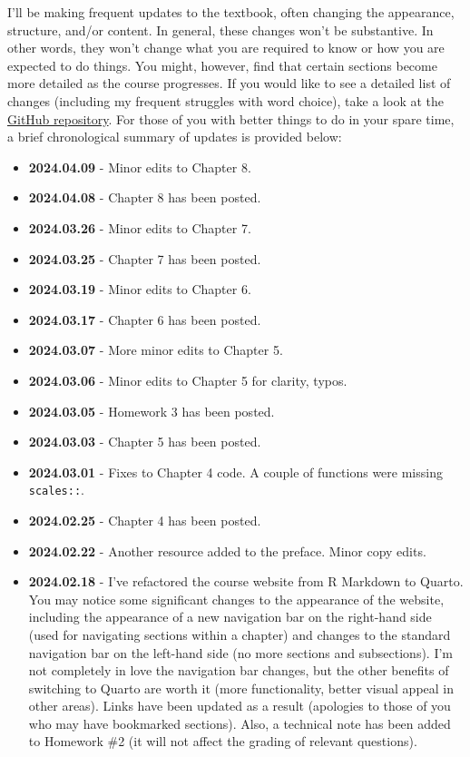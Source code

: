 \documentclass[
  letterpaper,
]{book}
\providecommand{\tightlist}{%
  \setlength{\itemsep}{0pt}\setlength{\parskip}{0pt}}\usepackage{longtable,booktabs,array}
\begin{document}

I'll be making frequent updates to the textbook, often changing the
appearance, structure, and/or content. In general, these changes won't
be substantive. In other words, they won't change what you are required
to know or how you are expected to do things. You might, however, find
that certain sections become more detailed as the course progresses. If
you would like to see a detailed list of changes (including my frequent
struggles with word choice), take a look at the
\href{https://github.com/wstubenbord/ScPoSPSSUR}{GitHub repository}. For
those of you with better things to do in your spare time, a brief
chronological summary of updates is provided below:

\begin{itemize}
\tightlist
\item
  \textbf{2024.04.09} - Minor edits to Chapter 8.
\item
  \textbf{2024.04.08} - Chapter 8 has been posted.
\item
  \textbf{2024.03.26} - Minor edits to Chapter 7.
\item
  \textbf{2024.03.25} - Chapter 7 has been posted.
\item
  \textbf{2024.03.19} - Minor edits to Chapter 6.
\item
  \textbf{2024.03.17} - Chapter 6 has been posted.
\item
  \textbf{2024.03.07} - More minor edits to Chapter 5.
\item
  \textbf{2024.03.06} - Minor edits to Chapter 5 for clarity, typos.
\item
  \textbf{2024.03.05} - Homework 3 has been posted.
\item
  \textbf{2024.03.03} - Chapter 5 has been posted.
\item
  \textbf{2024.03.01} - Fixes to Chapter 4 code. A couple of functions
  were missing \texttt{scales::}.
\item
  \textbf{2024.02.25} - Chapter 4 has been posted.
\item
  \textbf{2024.02.22} - Another resource added to the preface. Minor
  copy edits.
\item
  \textbf{2024.02.18} - I've refactored the course website from R
  Markdown to Quarto. You may notice some significant changes to the
  appearance of the website, including the appearance of a new
  navigation bar on the right-hand side (used for navigating sections
  within a chapter) and changes to the standard navigation bar on the
  left-hand side (no more sections and subsections). I'm not completely
  in love the navigation bar changes, but the other benefits of
  switching to Quarto are worth it (more functionality, better visual
  appeal in other areas). Links have been updated as a result (apologies
  to those of you who may have bookmarked sections). Also, a technical
  note has been added to Homework \#2 (it will not affect the grading of
  relevant questions).
\end{itemize}
\end{document}
